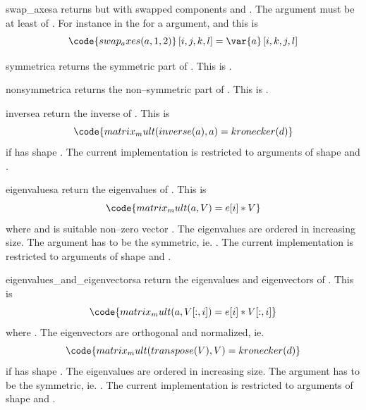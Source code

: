 \begin{funcdesc}{swap_axes}{a}
returns  but with swapped components  and  . The argument  must be
at least of \RankTwo. For instance in the
for a \RankFour argument,  and  this is
\begin{equation}
\code{swap_axes(a,1,2)}\left[i,j,k,l\right]=\var{a} \left[i,k,j,l\right]
\end{equation}
\end{funcdesc}

\begin{funcdesc}{symmetric}{a}
returns the symmetric part of . This is .
\end{funcdesc}
\begin{funcdesc}{nonsymmetric}{a}
returns the non--symmetric part of . This is .
\end{funcdesc}
\begin{funcdesc}{inverse}{a}
return the inverse of . This is
\begin{equation}
\code{matrix_mult(inverse(a),a)=kronecker(d)}
\end{equation}
if  has shape . The current implementation is restricted to arguments of shape
 and .
\end{funcdesc}
\begin{funcdesc}{eigenvalues}{a}
return the eigenvalues of . This is
\begin{equation}
\code{matrix_mult(a,V)=e[i]*V}
\end{equation}
where  and  is suitable non--zero vector .
The eigenvalues are ordered in increasing size.
The argument  has to be the symmetric, ie. .
The current implementation is restricted to arguments of shape
 and .
\end{funcdesc}
\begin{funcdesc}{eigenvalues_and_eigenvectors}{a}
return the eigenvalues and eigenvectors of . This is
\begin{equation}
\code{matrix_mult(a,V[:,i])=e[i]*V[:,i]}
\end{equation}
where . The eigenvectors  are orthogonal and normalized, ie.
\begin{equation}
\code{matrix_mult(transpose(V),V)=kronecker(d)}
\end{equation}
if  has shape . The eigenvalues are ordered in increasing size.
The argument  has to be the symmetric, ie. .
The current implementation is restricted to arguments of shape
 and .
\end{funcdesc}
